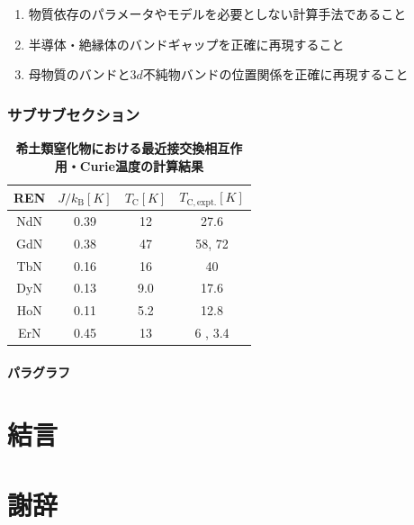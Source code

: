 \documentclass[a4paper,12pt,oneside,openany,uplatex,dvipdfmx]{jsarticle}
\begin{document}
\begin{enumerate}
	\item 物質依存のパラメータやモデルを必要としない計算手法であること
	\item 半導体・絶縁体のバンドギャップを正確に再現すること
	\item 母物質のバンドと$3d$不純物バンドの位置関係を正確に再現すること
\end{enumerate}

\subsubsection{サブサブセクション}\label{subsubsec:label}

\begin{table}[H]
  \centering
    \caption{\textbf{希土類窒化物における最近接交換相互作用・Curie温度の計算結果}}
    \begin{tabular}{cccc}  \hline 
    REN & $J/k_\mathrm{B}[K]$ &  $T_\mathrm{C}[K]$  & $T_\mathrm{C, expt.}[K]$ \\ \hline
    NdN & 0.39 & 12 & 27.6   \\ 
    GdN & 0.38 & 47 &  58, 72 \\ 
    TbN & 0.16 & 16 & 40   \\ 
    DyN & 0.13 & 9.0 & 17.6   \\ 
    HoN & 0.11 & 5.2 & 12.8   \\ 
    ErN & 0.45 & 13 & 6 , 3.4   \\  \hline 
    \end{tabular}
    \label{tab:REN_curie}
\end{table}

\paragraph{パラグラフ}\label{para:label}


\newpage
\section{結言}\label{sec:summary}


\newpage
\section{謝辞}\label{sec:acknow}
\end{document}
